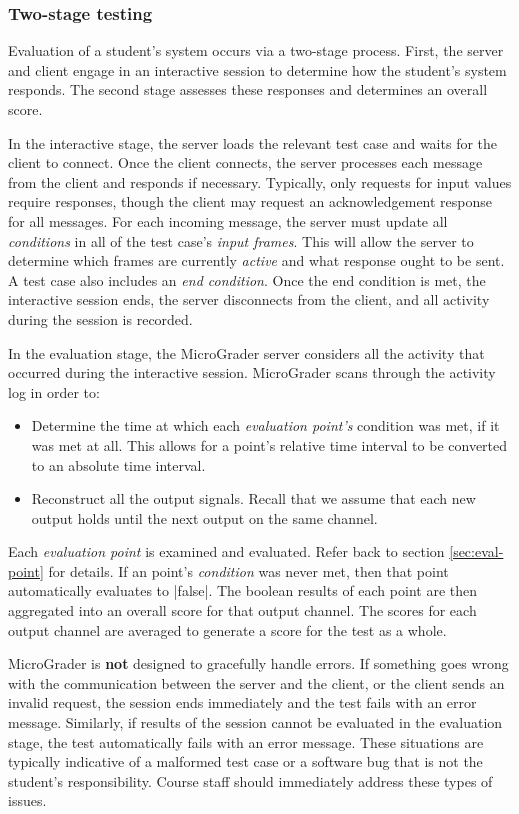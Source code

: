 \documentclass[12pt]{article}
\begin{document}
\subsubsection{Two-stage testing}
Evaluation of a student's system occurs via a two-stage process.  First, the server and client engage in an interactive session to determine how the student's system responds.  The second stage assesses these responses and determines an overall score.

In the interactive stage, the server loads the relevant test case and waits for the client to connect.  Once the client connects, the server processes each message from the client and responds if necessary.  Typically, only requests for input values require responses, though the client may request an acknowledgement response for all messages.  For each incoming message, the server must update all \textit{conditions} in all of the test case's \textit{input frames}.  This will allow the server to determine which frames are currently \textit{active} and what response ought to be sent.  A test case also includes an \textit{end condition}.  Once the end condition is met, the interactive session ends, the server disconnects from the client, and all activity during the session is recorded.

In the evaluation stage, the MicroGrader server considers all the activity that occurred during the interactive session.  MicroGrader scans through the activity log in order to:

\begin{itemize}
\item Determine the time at which each \textit{evaluation point's} condition was met, if it was met at all.  This allows for a point's relative time interval to be converted to an absolute time interval.
\item Reconstruct all the output signals.  Recall that we assume that each new output holds until the next output on the same channel.
\end{itemize}
Each \textit{evaluation point} is examined and evaluated.  Refer back to section \ref{sec:eval-point} for details.  If an point's \textit{condition} was never met, then that point automatically evaluates to |false|.  The boolean results of each point are then aggregated into an overall score for that output channel.  The scores for each output channel are averaged to generate a score for the test as a whole.

MicroGrader is \textbf{not} designed to gracefully handle errors.  If something goes wrong with the communication between the server and the client, or the client sends an invalid request, the session ends immediately and the test fails with an error message.  Similarly, if results of the session cannot be evaluated in the evaluation stage, the test automatically fails with an error message.  These situations are typically indicative of a malformed test case or a software bug that is not the student's responsibility.  Course staff should immediately address these types of issues.
\end{document}
